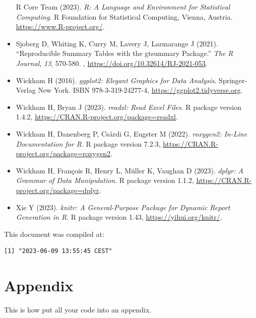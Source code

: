 \documentclass[]{elsarticle} %
\begin{document}
\begin{itemize}
  R Core Team (2023). \emph{R: A Language and Environment for
  Statistical Computing}. R Foundation for Statistical Computing,
  Vienna, Austria. \url{https://www.R-project.org/}.
\item
  Sjoberg D, Whiting K, Curry M, Lavery J, Larmarange J (2021).
  ``Reproducible Summary Tables with the gtsummary Package.'' \emph{The
  R Journal}, \emph{13}, 570-580. ,
  \url{https://doi.org/10.32614/RJ-2021-053}.
\item
  Wickham H (2016). \emph{ggplot2: Elegant Graphics for Data Analysis}.
  Springer-Verlag New York. ISBN 978-3-319-24277-4,
  \url{https://ggplot2.tidyverse.org}.
\item
  Wickham H, Bryan J (2023). \emph{readxl: Read Excel Files}. R package
  version 1.4.2, \url{https://CRAN.R-project.org/package=readxl}.
\item
  Wickham H, Danenberg P, Csárdi G, Eugster M (2022). \emph{roxygen2:
  In-Line Documentation for R}. R package version 7.2.3,
  \url{https://CRAN.R-project.org/package=roxygen2}.
\item
  Wickham H, François R, Henry L, Müller K, Vaughan D (2023).
  \emph{dplyr: A Grammar of Data Manipulation}. R package version 1.1.2,
  \url{https://CRAN.R-project.org/package=dplyr}.
\item
  Xie Y (2023). \emph{knitr: A General-Purpose Package for Dynamic
  Report Generation in R}. R package version 1.43,
  \url{https://yihui.org/knitr/}.
\end{itemize}

This document was compiled at:

\begin{verbatim}
[1] "2023-06-09 13:55:45 CEST"
\end{verbatim}

\hypertarget{appendix}{%
\section{Appendix}\label{appendix}}

This is how put all your code into an appendix.
\end{document}
